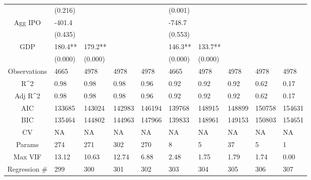 \documentclass{article}
\begin{document}
\begin{table}[H]
\begin{tabular}{|clllllllll|}
   & (0.216) &  &  &  & (0.001) &  &  &  &  \\ 
  Agg IPO & -401.4 &  &  &  & -748.7 &  &  &  &  \\ 
   & (0.435) &  &  &  & (0.553) &  &  &  &  \\ 
  GDP & 180.4** & 179.2** &  &  & 146.3** & 133.7** &  &  &  \\ 
   & (0.000) & (0.000) &  &  & (0.000) & (0.000) &  &  &  \\ 
  \hline 
 Observations & 4665 & 4978 & 4978 & 4978 & 4665 & 4978 & 4978 & 4978 & 4978 \\ 
  R^2 & 0.98 & 0.98 & 0.98 & 0.96 & 0.92 & 0.92 & 0.92 & 0.62 & 0.17 \\ 
  Adj R^2 & 0.98 & 0.98 & 0.98 & 0.96 & 0.92 & 0.92 & 0.92 & 0.62 & 0.17 \\ 
  AIC & 133685 & 143024 & 142983 & 146194 & 139768 & 148915 & 148899 & 150758 & 154631 \\ 
  BIC & 135464 & 144802 & 144963 & 147966 & 139833 & 148961 & 149153 & 150803 & 154651 \\ 
  CV & NA & NA & NA & NA & NA & NA & NA & NA & NA \\ 
  Params & 274 & 271 & 302 & 270 & 8 & 5 & 37 & 5 & 1 \\ 
  Max VIF & 13.12 & 10.63 & 12.74 & 6.88 & 2.48 & 1.75 & 1.79 & 1.74 & 0.00 \\ 
  Regression \# & 299 & 300 & 301 & 302 & 303 & 304 & 305 & 306 & 307 \\ 
   \hline
\end{tabular}
 
\end{table}
\end{document}
